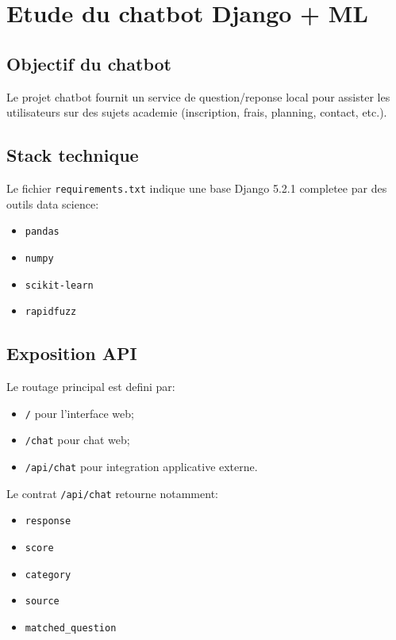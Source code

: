 \chapter{Etude du chatbot Django + ML}

\section{Objectif du chatbot}

Le projet chatbot fournit un service de question/reponse local pour assister les utilisateurs sur des sujets academie (inscription, frais, planning, contact, etc.).

\section{Stack technique}

Le fichier \texttt{requirements.txt} indique une base Django 5.2.1 completee par des outils data science:
\begin{itemize}[leftmargin=*]
  \item \texttt{pandas}
  \item \texttt{numpy}
  \item \texttt{scikit-learn}
  \item \texttt{rapidfuzz}
\end{itemize}

\section{Exposition API}

Le routage principal est defini par:
\begin{itemize}[leftmargin=*]
  \item \texttt{/} pour l'interface web;
  \item \texttt{/chat} pour chat web;
  \item \texttt{/api/chat} pour integration applicative externe.
\end{itemize}

Le contrat \texttt{/api/chat} retourne notamment:
\begin{itemize}[leftmargin=*]
  \item \texttt{response}
  \item \texttt{score}
  \item \texttt{category}
  \item \texttt{source}
  \item \texttt{matched\_question}
\end{itemize}

